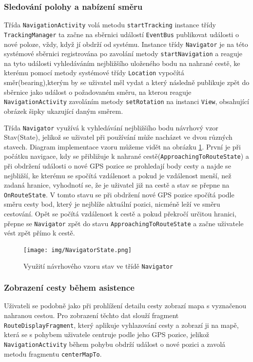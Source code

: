 \documentclass[czech,master,public,dept460,male,java,cpdeclaration]{diploma}
\begin{document}
\subsubsection{Sledování polohy a nabízení směru}
Třída \texttt{NavigationActivity} volá metodu \texttt{startTracking} instance třídy \texttt{TrackingManager}
ta začne na sběrnici událostí \texttt{EventBus} publikovat události o nové poloze, vždy, když jí
obdrží od systému.
Instance třídy \texttt{Navigator} je na této systémové sběrnici registrována po zavolání metody \texttt{startNavigation}
a reaguje na tyto události vyhledáváním nejbližšího uloženého bodu na nahrané cestě, ke kterému pomocí metody
systémové třídy \texttt{Location} vypočítá směr(bearing),kterým by se uživatel měl vydat a který následně publikuje zpět do sběrnice
 jako událost o požadovaném směru, na kterou reaguje \texttt{NavigationActivity} zavoláním metody \texttt{setRotation}
 na instanci \texttt{View}, obsahující obrázek šipky ukazující daným směrem.

Třída \texttt{Navigator} využívá k vyhledávání nejbližšího bodu návrhový vzor Stav(State), jelikož
se uživatel při používání může nacházet ve dvou různých stavech. Diagram implementace vzoru můžeme vidět
na obrázku \ref{fig:navigatorstate}. První je při počátku navigace,
kdy se přibližuje k nahrané cestě(\texttt{ApproachingToRouteState}) a při obdržení události o nové
GPS pozice se prohledají body cesty a najde se nejbližší, ke kterému se spočítá vzdálenost a pokud
je vzdálenost menší, než zadaná hranice, vyhodnotí se, že je uživatel již na cestě a stav se přepne
na \texttt{OnRouteState}.
V tomto stavu se při obdržení nové GPS pozice spočítá podle směru cesty bod, který je nejblíže aktuální pozici,
nicméně leží ve směru cestování. Opět se počítá vzdálenost k cestě a pokud překročí určitou hranici,
přepne se \texttt{Navigator} zpět do stavu \texttt{ApproachingToRouteState} a začne uživatele vést zpět přímo k cestě.

\begin{figure}[H]
        \centering
                \texttt{[image: img/NavigatorState.png]}
        \caption{Využití návrhového vzoru stav ve třídě \texttt{Navigator}}
        \label{fig:navigatorstate}
\end{figure}

\subsubsection{Zobrazení cesty během asistence}
Uživateli se podobně jako při prohlížení detailu cesty zobrazí mapa s vyznačenou nahranou cestou.
Pro zobrazení těchto dat slouží fragment \texttt{RouteDisplayFragment}, který aplikuje vyhlazování cesty
a zobrazí ji na mapě, která se s pohybem uživatele centruje podle jeho GPS pozice, jelikož
\texttt{NavigationActivity} během pohybu obdrží událost o nové pozici a zavolá metodu fragmentu \texttt{centerMapTo}.
\end{document}
